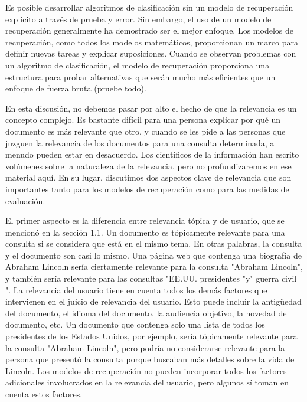 Es posible desarrollar algoritmos de clasificación sin un modelo de recuperación explícito a través de prueba y error. Sin embargo, el uso de un modelo de recuperación generalmente ha demostrado ser el mejor enfoque. Los modelos de recuperación, como todos los modelos matemáticos, proporcionan un marco para definir nuevas tareas y explicar suposiciones. Cuando se observan problemas con un algoritmo de clasificación, el modelo de recuperación proporciona una estructura para probar alternativas que serán mucho más eficientes que un enfoque de fuerza bruta (pruebe todo).

En esta discusión, no debemos pasar por alto el hecho de que la relevancia es un concepto complejo. Es bastante difícil para una persona explicar por qué un documento es más relevante que otro, y cuando se les pide a las personas que juzguen la relevancia de los documentos para una consulta determinada, a menudo pueden estar en desacuerdo. Los científicos de la información han escrito volúmenes sobre la naturaleza de la relevancia, pero no profundizaremos en ese material aquí. En su lugar, discutimos dos aspectos clave de relevancia que son importantes tanto para los modelos de recuperación como para las medidas de evaluación.


El primer aspecto es la diferencia entre relevancia tópica y de usuario, que se mencionó en la sección 1.1. Un documento es tópicamente relevante para una consulta si se considera que está en el mismo tema. En otras palabras, la consulta y el documento son casi lo mismo. Una página web que contenga una biografía de Abraham Lincoln sería ciertamente relevante para la consulta "Abraham Lincoln", y también sería relevante para las consultas "EE.UU. presidentes "y" guerra civil ". La relevancia del usuario tiene en cuenta todos los demás factores que intervienen en el juicio de relevancia del usuario. Esto puede incluir la antigüedad del documento, el idioma del documento, la audiencia objetivo, la novedad del documento, etc. Un documento que contenga solo una lista de todos los presidentes de los Estados Unidos, por ejemplo, sería tópicamente relevante para la consulta "Abraham Lincoln", pero podría no considerarse relevante para la persona que presentó la consulta porque buscaban más detalles sobre la vida de Lincoln. Los modelos de recuperación no pueden incorporar todos los factores adicionales involucrados en la relevancia del usuario, pero algunos sí toman en cuenta estos factores.

